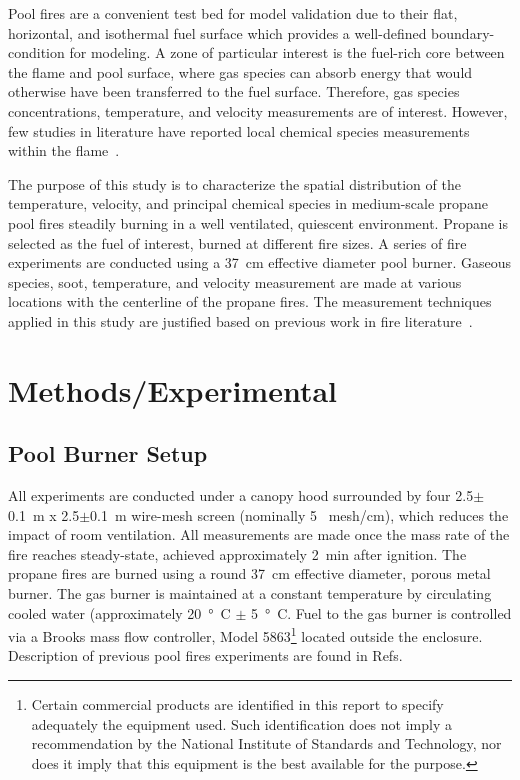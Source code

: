 \documentclass[12pt]{ussci}
\begin{document}
Pool fires are a convenient test bed for model validation due to their flat, horizontal, and isothermal fuel surface which provides a well-defined boundary-condition for modeling. A zone of particular interest is the fuel-rich core between the flame and pool surface, where gas species can absorb energy that would otherwise have been transferred to the fuel surface. Therefore, gas species concentrations, temperature, and velocity measurements are of interest. However, few studies in literature have reported local chemical species measurements within the flame~\cite{Fisher1987,Hamins2016,Choi1995,andrews2005,meier2000,bundy2007,Lock2008,Falkenstein2021a,Falkenstein2020a,Falkenstein2020b,Falkenstein2021b,ORLOFF1988General,ORLOFF1987Chemical,smith1992major}. 

The purpose of this study is to characterize the spatial distribution of the temperature, velocity, and principal chemical species in medium-scale propane pool fires steadily burning in a well ventilated, quiescent environment. Propane is selected as the fuel of interest, burned at different fire sizes. A series of fire experiments are conducted using a 37~cm effective diameter pool burner. Gaseous species, soot, temperature, and velocity measurement are made at various locations with the centerline of the propane fires. The measurement techniques applied in this study are justified based on previous work in fire literature~\cite{Falkenstein2021c,Choi1995}.


\section{Methods/Experimental}
\subsection{Pool Burner Setup}
All experiments are conducted under a canopy hood surrounded by four 2.5$\pm$0.1~m x 2.5$\pm$0.1~m wire-mesh screen (nominally 5~ mesh/cm), which reduces the impact of room ventilation. All measurements are made once the mass rate of the fire reaches steady-state, achieved approximately 2~min after ignition. 
The propane fires are burned using a round 37~cm effective diameter, porous metal burner. The gas burner is maintained at a constant temperature by circulating cooled water (approximately \SI{20}{\degree C} $\pm$ \SI{5}{\degree C}. Fuel to the gas burner is controlled via a Brooks mass flow controller, Model 5863\footnote{\label{fn:product} Certain commercial products are identified in this report to specify adequately the equipment used. Such identification does not imply a recommendation by the National Institute of Standards and Technology, nor does it imply that this equipment is the best available for the purpose.} located outside the enclosure. Description of previous pool fires experiments are found in Refs.~\cite{Hamins2016,Hamins1994,Hamins1991,Hamins1996a,Hamins1996b,Lock2008}
\end{document}
